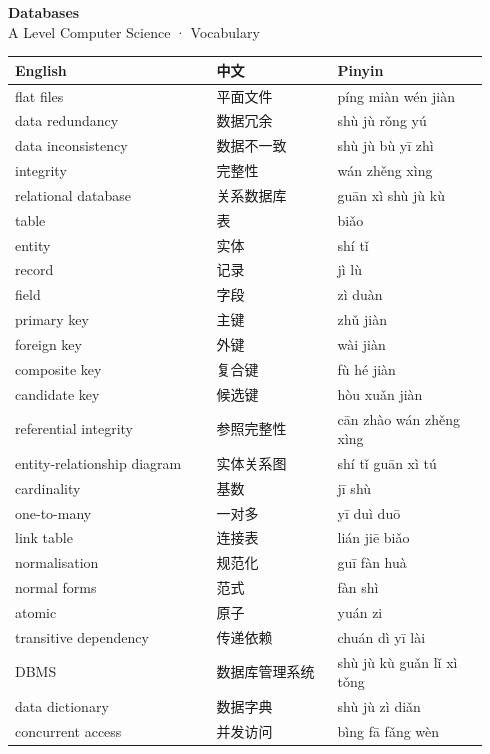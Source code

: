 \documentclass[11pt]{article}
\begin{document}
\begin{center}
  {\LARGE\bfseries Databases}\\[0.35em]
  {\large A Level Computer Science · Vocabulary}
\end{center}
\vspace{0.6em}

\begin{longtable}{@{}p{0.40\linewidth}p{0.24\linewidth}p{0.30\linewidth}@{}}
\toprule
\textbf{English} & \textbf{中文} & \textbf{Pinyin} \\
\midrule
\endhead
\bottomrule
\endlastfoot
flat files & 平面文件 & píng miàn wén jiàn \\
data redundancy & 数据冗余 & shù jù rǒng yú \\
data inconsistency & 数据不一致 & shù jù bù yī zhì \\
integrity & 完整性 & wán zhěng xìng \\
relational database & 关系数据库 & guān xì shù jù kù \\
table & 表 & biǎo \\
entity & 实体 & shí tǐ \\
record & 记录 & jì lù \\
field & 字段 & zì duàn \\
primary key & 主键 & zhǔ jiàn \\
foreign key & 外键 & wài jiàn \\
composite key & 复合键 & fù hé jiàn \\
candidate key & 候选键 & hòu xuǎn jiàn \\
referential integrity & 参照完整性 & cān zhào wán zhěng xìng \\
entity-relationship diagram & 实体关系图 & shí tǐ guān xì tú \\
cardinality & 基数 & jī shù \\
one-to-many & 一对多 & yī duì duō \\
link table & 连接表 & lián jiē biǎo \\
normalisation & 规范化 & guī fàn huà \\
normal forms & 范式 & fàn shì \\
atomic & 原子 & yuán zi \\
transitive dependency & 传递依赖 & chuán dì yī lài \\
DBMS & 数据库管理系统 & shù jù kù guǎn lǐ xì tǒng \\
data dictionary & 数据字典 & shù jù zì diǎn \\
concurrent access & 并发访问 & bìng fā fǎng wèn \\

\end{longtable}
\end{document}
